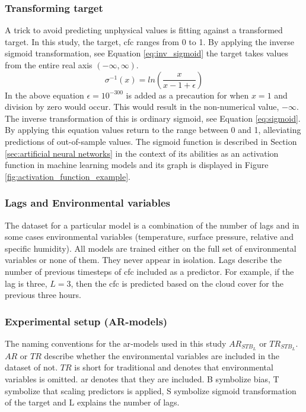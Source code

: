 \subsubsection{Transforming target} \label{sec:transforming_target}
A trick to avoid predicting unphysical values is fitting against a transformed target. In this study, the target, \acrfull{cfc} ranges from 0 to 1. By applying the inverse sigmoid transformation, see Equation \eqref{eq:inv_sigmoid} the target takes values from the entire real axis $(-\infty, \infty)$. 
\begin{equation} \label{eq:inv_sigmoid}
   \sigma^{-1} \left( x \right) = ln \left(\frac{x}{x - 1 + \epsilon} \right)
\end{equation}
In the above equation $\epsilon = 10^{-300}$ is added as a precaution for when $x=1$ and division by zero would occur. This would result in the non-numerical value, $-\infty$. The inverse transformation of this is ordinary sigmoid, see Equation \eqref{eq:sigmoid}. By applying this equation values return to the range between 0 and 1, alleviating predictions of out-of-sample values. The sigmoid function is described in Section \ref{sec:artificial neural networks} in the context of its abilities as an activation function in machine learning models and its graph is displayed in Figure \ref{fig:activation_function_example}.

\subsubsection{Lags and Environmental variables}
The dataset for a particular model is a combination of the number of lags and in some cases environmental variables (temperature, surface pressure, relative and specific humidity). All models are trained either on the full set of environmental variables or none of them. %
They never appear in isolation. Lags describe the number of previous timesteps of \acrshort{cfc} included as a predictor. For example, if the lag is three, $L=3$, then the \acrshort{cfc} is predicted based on the cloud cover for the previous three hours.


\subsubsection{Experimental setup (AR-models)}
The naming conventions for the \acrshort{ar}-models used in this study $AR_{STB_L}$ or $TR_{STB_L}$. $AR$ or $TR$ describe whether the environmental variables are included in the dataset of not. $TR$ is short for traditional and denotes that environmental variables is omitted. \acrshort{ar} denotes that they are included. B symbolize bias, T symbolize that scaling predictors is applied, S symbolize sigmoid transformation of the target and L explains the number of lags.  

